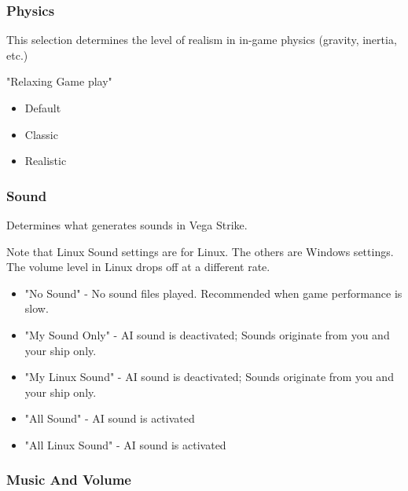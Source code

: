 \documentclass{article}
\begin{document}
\subsubsection{Physics }

This selection determines the level of realism in in-game physics (gravity, inertia, etc.)

"Relaxing Game play"

\begin{itemize}
\item  Default

\item  Classic

\item Realistic
\end{itemize}



\subsubsection{Sound }

Determines what generates sounds in Vega Strike.



Note that Linux Sound settings are for Linux. The others are Windows settings. The volume level in Linux drops off at a different rate.



\begin{itemize}
\item  "No Sound" - No sound files played. Recommended when game performance is slow.
\end{itemize}



\begin{itemize}
\item  "My Sound Only" - AI sound is deactivated; Sounds originate from you and your ship only.  

\item  "My Linux Sound" - AI sound is deactivated; Sounds originate from you and your ship only. 

\item  "All Sound" - AI sound is activated  

\item  "All Linux Sound" - AI sound is activated  
\end{itemize}



\subsubsection{Music And Volume }
\end{document}
